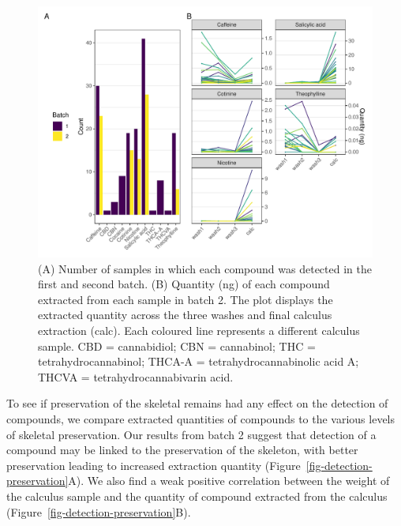 \documentclass[
]{article}
\begin{document}
\begin{figure}

{\centering \includegraphics{paper_files/figure-pdf/fig-auth-plot-batch2-1.pdf}

}

\caption{\label{fig-auth-plot-batch2}(A) Number of samples in which each
compound was detected in the first and second batch. (B) Quantity (ng)
of each compound extracted from each sample in batch 2. The plot
displays the extracted quantity across the three washes and final
calculus extraction (calc). Each coloured line represents a different
calculus sample. CBD = cannabidiol; CBN = cannabinol; THC =
tetrahydrocannabinol; THCA-A = tetrahydrocannabinolic acid A; THCVA =
tetrahydrocannabivarin acid.}

\end{figure}

To see if preservation of the skeletal remains had any effect on the
detection of compounds, we compare extracted quantities of compounds to
the various levels of skeletal preservation. Our results from batch 2
suggest that detection of a compound may be linked to the preservation
of the skeleton, with better preservation leading to increased
extraction quantity (Figure~\ref{fig-detection-preservation}A). We also
find a weak positive correlation between the weight of the calculus
sample and the quantity of compound extracted from the calculus
(Figure~\ref{fig-detection-preservation}B).
\end{document}
